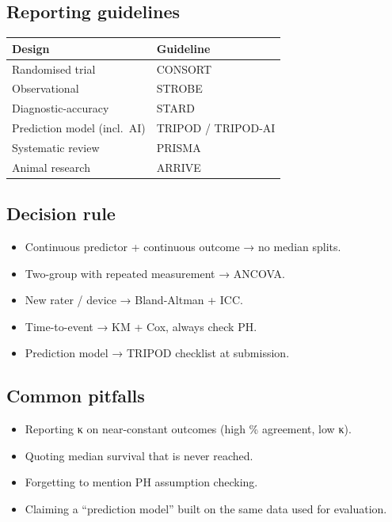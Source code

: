 \documentclass[
]{article}
\newcounter{none} %
\providecommand{\tightlist}{%
  \setlength{\itemsep}{0pt}\setlength{\parskip}{0pt}}
\begin{document}
\subsection{Reporting guidelines}\label{reporting-guidelines}

{\def\LTcaptype{none} %
\begin{longtable}[]{@{}ll@{}}
\toprule\noalign{}
Design & Guideline \\
\midrule\noalign{}
\endhead
\bottomrule\noalign{}
\endlastfoot
Randomised trial & CONSORT \\
Observational & STROBE \\
Diagnostic-accuracy & STARD \\
Prediction model (incl.~AI) & TRIPOD / TRIPOD-AI \\
Systematic review & PRISMA \\
Animal research & ARRIVE \\
\end{longtable}
}

\subsection{Decision rule}\label{decision-rule-7}

\begin{itemize}
\tightlist
\item
  Continuous predictor + continuous outcome → no median splits.
\item
  Two-group with repeated measurement → ANCOVA.
\item
  New rater / device → Bland-Altman + ICC.
\item
  Time-to-event → KM + Cox, always check PH.
\item
  Prediction model → TRIPOD checklist at submission.
\end{itemize}

\subsection{Common pitfalls}\label{common-pitfalls-7}

\begin{itemize}
\tightlist
\item
  Reporting κ on near-constant outcomes (high \% agreement, low κ).
\item
  Quoting median survival that is never reached.
\item
  Forgetting to mention PH assumption checking.
\item
  Claiming a ``prediction model'' built on the same data used for
  evaluation.
\end{itemize}
\end{document}
